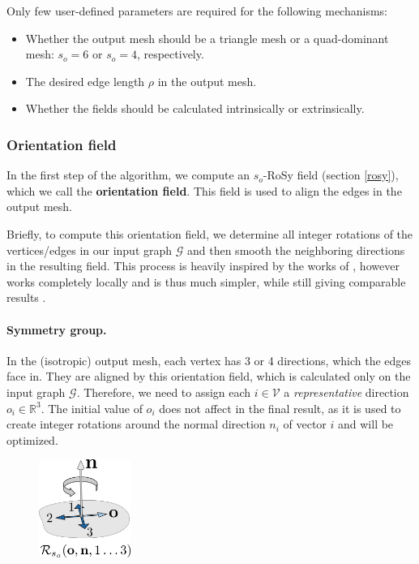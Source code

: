 \documentclass{ACGSeminar}
\begin{document}
Only few user-defined parameters are required for the following mechanisms:
\begin{itemize}
	\item	Whether the output mesh should be a triangle mesh or a quad-dominant mesh: $s_o = 6$ or $s_o = 4$, respectively.
	\item	The desired edge length $\rho$ in the output mesh.
	\item	Whether the fields should be calculated intrinsically or extrinsically.
\end{itemize}

\subsubsection{Orientation field}\label{orientation-field}
In the first step of the algorithm, we compute an $s_o$-RoSy field (section \ref{rosy}), which we call the \textbf{orientation field}. This field is used to align the edges in the output mesh.\bigskip

Briefly, to compute this orientation field, we determine all integer rotations of the vertices/edges in our input graph $\mathcal{G}$ and then smooth the neighboring directions in the resulting field. This process is heavily inspired by the works of \cite{bommes2009mixed,ray2008n}, however works completely locally and is thus much simpler, while still giving comparable results \cite{jakob2015instant}.

\paragraph{Symmetry group.}
In the (isotropic) output mesh, each vertex has 3 or 4 directions, which the edges face in. They are aligned by this orientation field, which is calculated only on the input graph $\mathcal{G}$. Therefore, we need to assign each $i \in \mathcal{V}$ a \textit{representative} direction $o_i \in \mathbb{R}^3$. The initial value of $o_i$ does not affect in the final result, as it is used to create integer rotations around the normal direction $n_i$ of vector $i$ and will be optimized.\bigskip

\begin{figure}
	\includegraphics[width=3cm]{img/integer-rotation.png}\par
	\label{fig:integer-rotation}
\end{figure}
\end{document}
